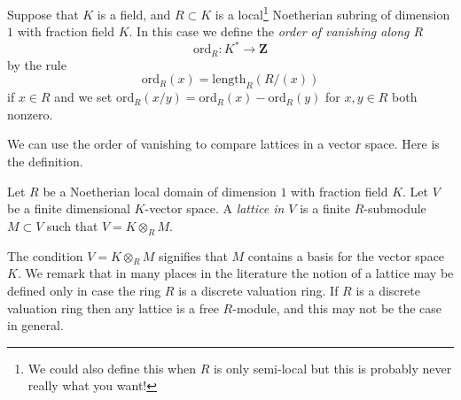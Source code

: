 \begin{definition}
\label{definition-ord}
Suppose that $K$ is a field, and $R \subset K$ is a
local\footnote{We could also define this when $R$ is only
semi-local but this is probably never really what you want!}
Noetherian subring of dimension $1$ with fraction field $K$.
In this case we define the {\it order of vanishing along $R$}
$$
\text{ord}_R : K^* \longrightarrow \mathbf{Z}
$$
by the rule
$$
\text{ord}_R(x) = \text{length}_R(R/(x))
$$
if $x \in R$ and we set
$\text{ord}_R(x/y) = \text{ord}_R(x) - \text{ord}_R(y)$
for $x, y \in R$ both nonzero.
\end{definition}

\noindent
We can use the order of vanishing to compare lattices in a
vector space. Here is the definition.

\begin{definition}
\label{definition-lattice}
Let $R$ be a Noetherian local domain of dimension $1$ with
fraction field $K$. Let $V$ be a finite dimensional $K$-vector space.
A {\it lattice in $V$} is a finite $R$-submodule $M \subset V$ such
that $V = K \otimes_R M$.
\end{definition}

\noindent
The condition $V = K \otimes_R M$ signifies that $M$ contains a
basis for the vector space $K$. We remark that in many places in the
literature the notion of a lattice may be defined only in case the
ring $R$ is a discrete valuation ring. If $R$ is a discrete valuation
ring then any lattice is a free $R$-module, and this may not be the case
in general.

